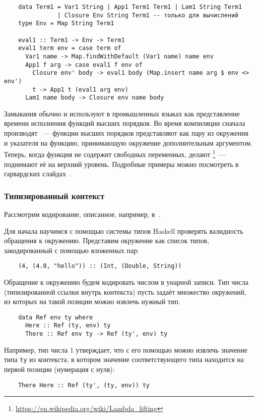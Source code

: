 \begin{verbatim}
    data Term1 = Var1 String | App1 Term1 Term1 | Lam1 String Term1
               | Closure Env String Term1 -- только для вычислений
    type Env = Map String Term1

    eval1 :: Term1 -> Env -> Term1
    eval1 term env = case term of
      Var1 name -> Map.findWithDefault (Var1 name) name env
      App1 f arg -> case eval1 f env of
        Closure env' body -> eval1 body (Map.insert name arg $ env <> env')
        t -> App1 t (eval1 arg env)
      Lam1 name body -> Closure env name body
\end{verbatim}

Замыкания обычно и используют в промышленных языках как представление времени исполнения функций высших порядков.
Во время компиляции сначала производят ~--- функции высших порядков представляют как пару из окружения и указателя на функцию, принимающую окружение дополнительным аргументом.
Теперь, когда функция не содержит свободных переменных, делают \footnote{\url{https://en.wikipedia.org/wiki/Lambda_lifting}}~--- поднимают её на верхний уровень.
Подробные примеры можно посмотреть в гарвардских слайдах~\cite{closures-slides}.

\subsubsection{Типизированный контекст} \label{subsubsec:typed-env}

Рассмотрим кодирование, описанное, например, в~\cite{kiselyov2012typed}.

Для начала научимся с помощью системы типов Haskell проверять валидность обращения к окружению.
Представим окружение как список типов, закодированный с помощью вложенных пар:
\begin{verbatim}
    (4, (4.0, "hello")) :: (Int, (Double, String))
\end{verbatim}

Обращение к окружению будем кодировать числом в унарной записи.
Тип числа (типизированной ссылки внутрь контекста) пусть задаёт множество окружений, из которых на такой позиции можно извлечь нужный тип.
\begin{verbatim}
    data Ref env ty where
      Here :: Ref (ty, env) ty
      There :: Ref env ty -> Ref (ty', env) ty
\end{verbatim}
Например, тип числа 1 утверждает, что с его помощью можно извлечь значение типа \texttt{ty} из контекста, в котором значение соответствующего типа находится на первой позиции (нумерация с нуля):
\begin{verbatim}
    There Here :: Ref (ty', (ty, env)) ty
\end{verbatim}

